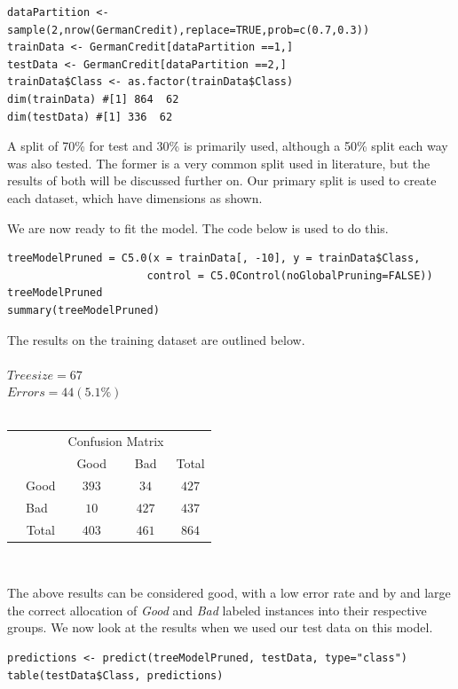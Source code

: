 \documentclass[paper=a4, fontsize=11pt]{scrartcl} %
\begin{document}
{{\begin{lstlisting}
dataPartition <- sample(2,nrow(GermanCredit),replace=TRUE,prob=c(0.7,0.3))
trainData <- GermanCredit[dataPartition ==1,]
testData <- GermanCredit[dataPartition ==2,]
trainData$Class <- as.factor(trainData$Class)
dim(trainData) #[1] 864  62
dim(testData) #[1] 336  62
\end{lstlisting}}
\par{A split of 70\% for test and 30\% is primarily used, although a 50\% split each way was also tested. The former is a very common split used in literature, but the results of both will be discussed further on. Our primary split is used to create each dataset, which have dimensions as shown. }
\par{We are now ready to fit the model. The code below is used to do this.
\begin{lstlisting}
treeModelPruned = C5.0(x = trainData[, -10], y = trainData$Class,
                      control = C5.0Control(noGlobalPruning=FALSE))
treeModelPruned
summary(treeModelPruned)
\end{lstlisting}}
{\noindent The results on the training dataset are outlined below.}\\\\
{$Tree size = 67$}\\
{$Errors = 44( 5.1\%)  $}\\\\
\begin{tabular}{l|l|c|c|c}
\multicolumn{2}{c}{}&\multicolumn{2}{c}{Confusion Matrix}&\\
\cline{3-4}
\multicolumn{2}{c|}{}&Good&Bad&\multicolumn{1}{c}{Total}\\
\cline{2-4}
\multirow{2}{*}{}& Good & $393$ & $34$ & $427$\\
\cline{2-4}
& Bad & $10$ & $427$ & $437$\\
\cline{2-4}
\multicolumn{1}{c}{} & \multicolumn{1}{c}{Total} & \multicolumn{1}{c}{$403$} & \multicolumn{    1}{c}{$461$} & \multicolumn{1}{c}{$864$}\\
\end{tabular}\\
}
{\par The above results can be considered good, with a low error rate and by and large the correct allocation of {\it Good} and {\it Bad} labeled instances into their respective groups. We now look at the results when we used our test data on this model. 
\begin{lstlisting}
predictions <- predict(treeModelPruned, testData, type="class")
table(testData$Class, predictions)
\end{lstlisting}}
\end{document}
